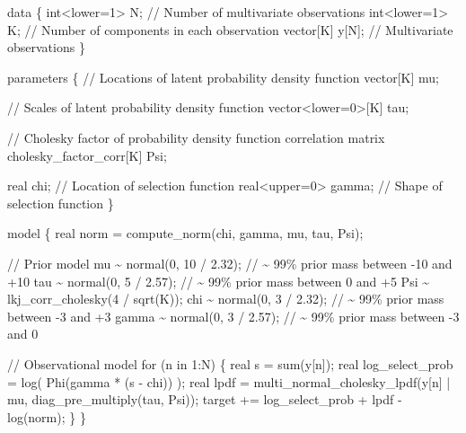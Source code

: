 \documentclass[
  letterpaper,
  DIV=11,
  numbers=noendperiod]{scrartcl}
\newenvironment{Shaded}{\begin{snugshade}}{\end{snugshade}}
\newcommand{\CommentTok}[1]{\textcolor[rgb]{0.37,0.37,0.37}{#1}}
\newcommand{\ControlFlowTok}[1]{\textcolor[rgb]{0.00,0.23,0.31}{#1}}
\newcommand{\DataTypeTok}[1]{\textcolor[rgb]{0.68,0.00,0.00}{#1}}
\newcommand{\DecValTok}[1]{\textcolor[rgb]{0.68,0.00,0.00}{#1}}
\newcommand{\FloatTok}[1]{\textcolor[rgb]{0.68,0.00,0.00}{#1}}
\newcommand{\KeywordTok}[1]{\textcolor[rgb]{0.00,0.23,0.31}{#1}}
\newcommand{\NormalTok}[1]{\textcolor[rgb]{0.00,0.23,0.31}{#1}}
\begin{document}
\begin{codelisting}
\begin{Shaded}
\begin{Highlighting}[]
\KeywordTok{data}\NormalTok{ \{}
  \DataTypeTok{int}\NormalTok{\textless{}}\KeywordTok{lower}\NormalTok{=}\DecValTok{1}\NormalTok{\textgreater{} N; }\CommentTok{// Number of multivariate observations}
  \DataTypeTok{int}\NormalTok{\textless{}}\KeywordTok{lower}\NormalTok{=}\DecValTok{1}\NormalTok{\textgreater{} K; }\CommentTok{// Number of components in each observation}
  \DataTypeTok{vector}\NormalTok{[K] y[N]; }\CommentTok{// Multivariate observations}
\NormalTok{\}}

\KeywordTok{parameters}\NormalTok{ \{}
  \CommentTok{// Locations of latent probability density function}
  \DataTypeTok{vector}\NormalTok{[K] mu;}

  \CommentTok{// Scales of latent probability density function}
  \DataTypeTok{vector}\NormalTok{\textless{}}\KeywordTok{lower}\NormalTok{=}\DecValTok{0}\NormalTok{\textgreater{}[K] tau;}

  \CommentTok{// Cholesky factor of probability density function correlation matrix}
  \DataTypeTok{cholesky\_factor\_corr}\NormalTok{[K] Psi;}

  \DataTypeTok{real}\NormalTok{ chi;            }\CommentTok{// Location of selection function}
  \DataTypeTok{real}\NormalTok{\textless{}}\KeywordTok{upper}\NormalTok{=}\DecValTok{0}\NormalTok{\textgreater{} gamma; }\CommentTok{// Shape of selection function}
\NormalTok{\}}

\KeywordTok{model}\NormalTok{ \{}
  \DataTypeTok{real}\NormalTok{ norm = compute\_norm(chi, gamma, mu, tau, Psi);}
  
  \CommentTok{// Prior model}
\NormalTok{  mu \textasciitilde{} normal(}\DecValTok{0}\NormalTok{, }\DecValTok{10}\NormalTok{ / }\FloatTok{2.32}\NormalTok{);   }\CommentTok{// \textasciitilde{} 99\% prior mass between {-}10 and +10}
\NormalTok{  tau \textasciitilde{} normal(}\DecValTok{0}\NormalTok{, }\DecValTok{5}\NormalTok{ / }\FloatTok{2.57}\NormalTok{);   }\CommentTok{// \textasciitilde{} 99\% prior mass between 0 and +5}
\NormalTok{  Psi \textasciitilde{} lkj\_corr\_cholesky(}\DecValTok{4}\NormalTok{ / sqrt(K));}
\NormalTok{  chi \textasciitilde{} normal(}\DecValTok{0}\NormalTok{, }\DecValTok{3}\NormalTok{ / }\FloatTok{2.32}\NormalTok{);   }\CommentTok{// \textasciitilde{} 99\% prior mass between {-}3 and +3}
\NormalTok{  gamma \textasciitilde{} normal(}\DecValTok{0}\NormalTok{, }\DecValTok{3}\NormalTok{ / }\FloatTok{2.57}\NormalTok{); }\CommentTok{// \textasciitilde{} 99\% prior mass between {-}3 and  0}

  \CommentTok{// Observational model}
  \ControlFlowTok{for}\NormalTok{ (n }\ControlFlowTok{in} \DecValTok{1}\NormalTok{:N) \{}
    \DataTypeTok{real}\NormalTok{ s = sum(y[n]);}
    \DataTypeTok{real}\NormalTok{ log\_select\_prob = log( Phi(gamma * (s {-} chi)) );}
    \DataTypeTok{real}\NormalTok{ lpdf = }
\NormalTok{      multi\_normal\_cholesky\_lpdf(y[n] | mu, diag\_pre\_multiply(tau, Psi));}
    \KeywordTok{target +=}\NormalTok{ log\_select\_prob + lpdf {-} log(norm);}
\NormalTok{  \}}
\NormalTok{\}}


\end{Highlighting}
\end{Shaded}
\end{codelisting}
\end{document}
